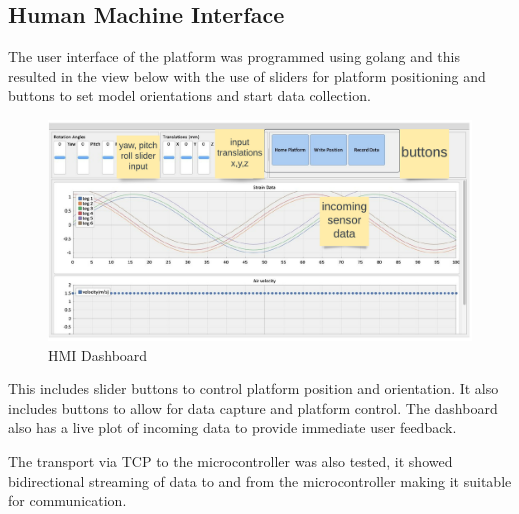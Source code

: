 \subsection{Human Machine Interface}
The user interface of the platform was programmed using golang and this resulted in the view below with the use of sliders for platform positioning and buttons to set model orientations and start data collection.
\begin{center}
	\begin{figure}[H]
		\centering
		\includegraphics[width=1\linewidth]{Figures/hmi}
		\caption[HMI Dashboard]{HMI Dashboard}
	\end{figure}
\end{center}

This includes slider buttons to control platform position and orientation. It also includes buttons to allow for data capture  and platform control. The dashboard also has a live plot of incoming data to provide immediate user feedback.

The transport via TCP to the microcontroller was also tested, it showed bidirectional streaming of data to and from the microcontroller making it suitable for communication.

